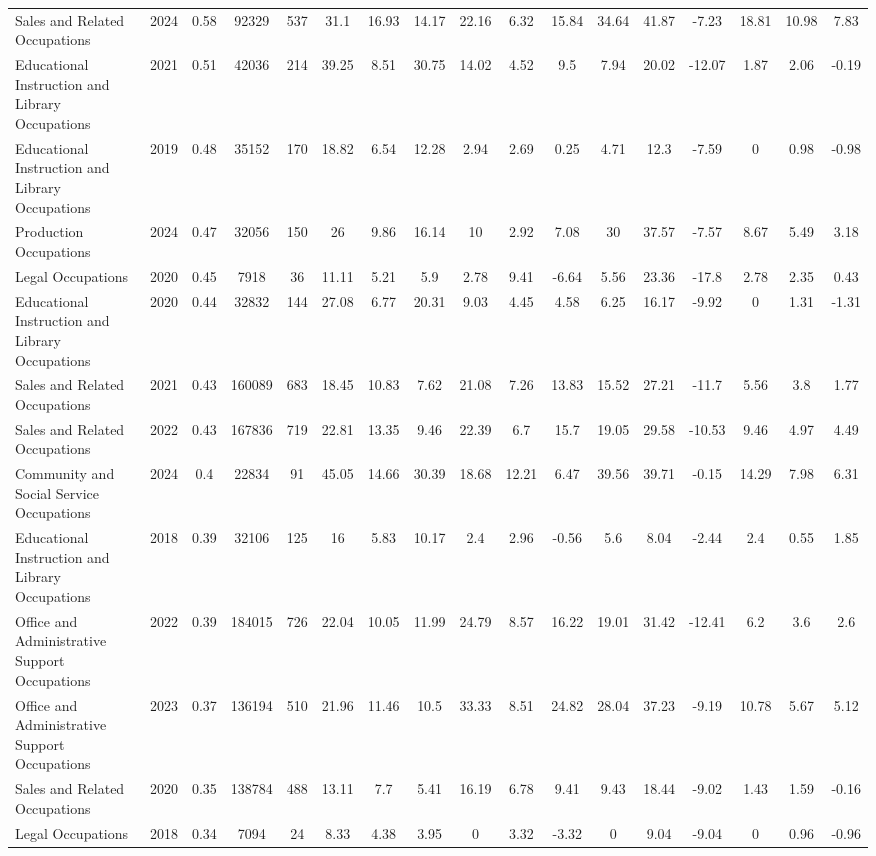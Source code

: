 \begin{landscape}
\begin{table}[htbp]
\begin{tabular}{lcccccccccccccccc}
Sales and Related Occupations & 2024 & 0.58 & 92329 & 537 & 31.1 & 16.93 & 14.17 & 22.16 & 6.32 & 15.84 & 34.64 & 41.87 & -7.23 & 18.81 & 10.98 & 7.83 \\
Educational Instruction and Library Occupations & 2021 & 0.51 & 42036 & 214 & 39.25 & 8.51 & 30.75 & 14.02 & 4.52 & 9.5 & 7.94 & 20.02 & -12.07 & 1.87 & 2.06 & -0.19 \\
Educational Instruction and Library Occupations & 2019 & 0.48 & 35152 & 170 & 18.82 & 6.54 & 12.28 & 2.94 & 2.69 & 0.25 & 4.71 & 12.3 & -7.59 & 0 & 0.98 & -0.98 \\
Production Occupations & 2024 & 0.47 & 32056 & 150 & 26 & 9.86 & 16.14 & 10 & 2.92 & 7.08 & 30 & 37.57 & -7.57 & 8.67 & 5.49 & 3.18 \\
Legal Occupations & 2020 & 0.45 & 7918 & 36 & 11.11 & 5.21 & 5.9 & 2.78 & 9.41 & -6.64 & 5.56 & 23.36 & -17.8 & 2.78 & 2.35 & 0.43 \\
Educational Instruction and Library Occupations & 2020 & 0.44 & 32832 & 144 & 27.08 & 6.77 & 20.31 & 9.03 & 4.45 & 4.58 & 6.25 & 16.17 & -9.92 & 0 & 1.31 & -1.31 \\
Sales and Related Occupations & 2021 & 0.43 & 160089 & 683 & 18.45 & 10.83 & 7.62 & 21.08 & 7.26 & 13.83 & 15.52 & 27.21 & -11.7 & 5.56 & 3.8 & 1.77 \\
Sales and Related Occupations & 2022 & 0.43 & 167836 & 719 & 22.81 & 13.35 & 9.46 & 22.39 & 6.7 & 15.7 & 19.05 & 29.58 & -10.53 & 9.46 & 4.97 & 4.49 \\
Community and Social Service Occupations & 2024 & 0.4 & 22834 & 91 & 45.05 & 14.66 & 30.39 & 18.68 & 12.21 & 6.47 & 39.56 & 39.71 & -0.15 & 14.29 & 7.98 & 6.31 \\
Educational Instruction and Library Occupations & 2018 & 0.39 & 32106 & 125 & 16 & 5.83 & 10.17 & 2.4 & 2.96 & -0.56 & 5.6 & 8.04 & -2.44 & 2.4 & 0.55 & 1.85 \\
Office and Administrative Support Occupations & 2022 & 0.39 & 184015 & 726 & 22.04 & 10.05 & 11.99 & 24.79 & 8.57 & 16.22 & 19.01 & 31.42 & -12.41 & 6.2 & 3.6 & 2.6 \\
Office and Administrative Support Occupations & 2023 & 0.37 & 136194 & 510 & 21.96 & 11.46 & 10.5 & 33.33 & 8.51 & 24.82 & 28.04 & 37.23 & -9.19 & 10.78 & 5.67 & 5.12 \\
Sales and Related Occupations & 2020 & 0.35 & 138784 & 488 & 13.11 & 7.7 & 5.41 & 16.19 & 6.78 & 9.41 & 9.43 & 18.44 & -9.02 & 1.43 & 1.59 & -0.16 \\
Legal Occupations & 2018 & 0.34 & 7094 & 24 & 8.33 & 4.38 & 3.95 & 0 & 3.32 & -3.32 & 0 & 9.04 & -9.04 & 0 & 0.96 & -0.96 \\

\end{tabular}
\end{table}
\end{landscape}
